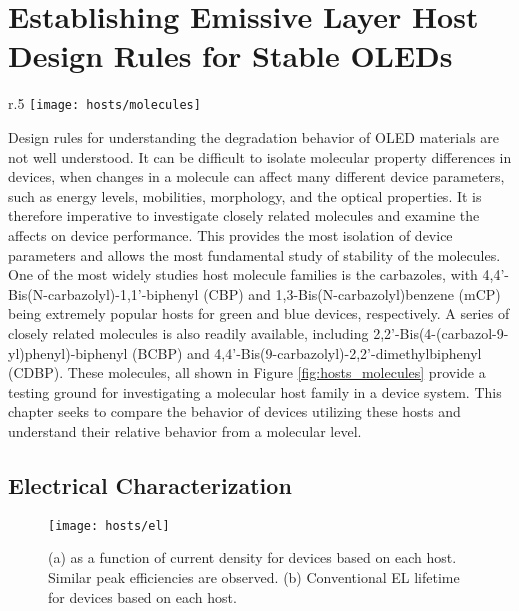 \documentclass[../thesis.tex]{subfiles}
\begin{document}
\chapter{Establishing Emissive Layer Host Design Rules for Stable OLEDs}\label{sec:hosts}

\begin{wrapfigure}{r}{.5\textwidth}
\centering
\texttt{[image: hosts/molecules]}
\caption{Host molecules used in this study.}
\label{fig:hosts_molecules}
\end{wrapfigure}

Design rules for understanding the degradation behavior of OLED materials are not well understood.
It can be difficult to isolate molecular property differences in devices, when changes in a molecule can affect many different device parameters, such as energy levels, mobilities, morphology, and the optical properties.
It is therefore imperative to investigate closely related molecules and examine the affects on device performance.
This provides the most isolation of device parameters and allows the most fundamental study of stability of the molecules.
One of the most widely studies host molecule families is the carbazoles, with 4,4'-Bis(N-carbazolyl)-1,1'-biphenyl (CBP) and 1,3-Bis(N-carbazolyl)benzene (mCP) being extremely popular hosts for green and blue devices, respectively.\supercite{Parshin2006,Miyaguchi2014,Choi2013,Giebink2006,Ingram2017,Adachi2001a,Kondakov2007d,Bagnich2015,Goushi2004a,Uratani2016,Holmes2003,Notsuka2017,Kim2010,Kawamura2006,Chopra2008,Li2014,Wang2015,Uoyama2012,Jankus2014}
A series of closely related molecules is also readily available, including 2,2'-Bis(4-(carbazol-9-yl)phenyl)-biphenyl (BCBP) and 4,4'-Bis(9-carbazolyl)-2,2'-dimethylbiphenyl (CDBP).
These molecules, all shown in Figure \ref{fig:hosts_molecules} provide a testing ground for investigating a molecular host family in a device system.
This chapter seeks to compare the behavior of devices utilizing these hosts and understand their relative behavior from a molecular level.


\section{Electrical Characterization}

\begin{figure}[ht]
\centering
\texttt{[image: hosts/el]}
\caption{(a)  \eqe as a function of current density for devices based on each host.  Similar peak efficiencies are observed.  (b) Conventional EL lifetime for devices based on each host.}
\label{fig:hosts_el}
\end{figure}
\end{document}
